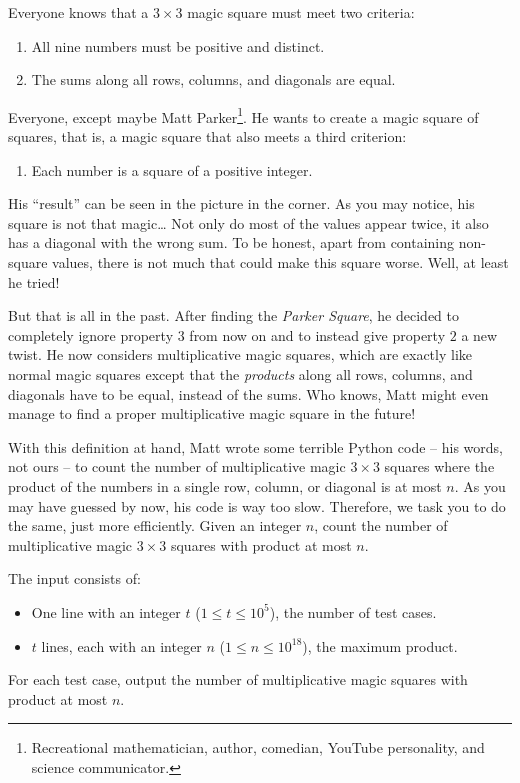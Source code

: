 \problemname{}


Everyone knows that a $3\times3$ magic square must meet two criteria:
\begin{enumerate}
	\item All nine numbers must be positive and distinct.
	\item The sums along all rows, columns, and diagonals are equal.
\end{enumerate}
Everyone, except  maybe Matt Parker\footnote{Recreational mathematician, author, comedian, YouTube personality, and science communicator.}.
He wants to create a magic square of squares, that is, a magic square that also meets a third criterion:
\begin{enumerate}[resume]
	\item Each number is a square of a positive integer.
\end{enumerate}
His ``result'' can be seen in the picture in the corner.
As you may notice, his square is not that magic\dots{}
Not only do most of the values appear twice, it also has a diagonal with the wrong sum.
To be honest, apart from containing non-square values, there is not much that could make this square worse.
Well, at least he tried!

But that is all in the past.
After finding the \emph{Parker Square}, he decided to completely ignore property $3$ from now on and to instead give property $2$ a new twist.
He now considers multiplicative magic squares, which are exactly like normal magic squares except that the \emph{products} along all rows, columns, and diagonals have to be equal, instead of the sums.
Who knows, Matt might even manage to find a proper multiplicative magic square in the future!

With this definition at hand, Matt wrote some terrible Python code -- his words, not ours -- to count the number of multiplicative magic $3\times 3$ squares where the product of the numbers in a single row, column, or diagonal is at most $n$.
As you may have guessed by now, his code is way too slow.
Therefore, we task you to do the same, just more efficiently.
Given an integer $n$, count the number of multiplicative magic $3\times 3$ squares with product at most $n$.

\begin{Input}
	The input consists of:
	\begin{itemize}
		\item One line with an integer $t$ ($1 \leq t \leq 10^5$), the number of test cases.
    \item $t$ lines, each with an integer $n$ ($1 \leq n \leq 10^{18}$), the maximum product.
	\end{itemize}
\end{Input}

\begin{Output}
	For each test case, output the number of multiplicative magic squares with product at most $n$.
\end{Output}
